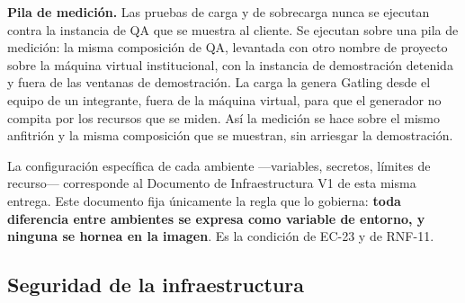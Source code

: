 \documentclass[11pt,a4paper]{article}
\begin{document}
\noindent\textbf{Pila de medición.} Las pruebas de carga y de sobrecarga nunca se ejecutan contra la instancia de QA que se muestra al cliente. Se ejecutan sobre una pila de medición: la misma composición de QA, levantada con otro nombre de proyecto sobre la máquina virtual institucional, con la instancia de demostración detenida y fuera de las ventanas de demostración. La carga la genera Gatling desde el equipo de un integrante, fuera de la máquina virtual, para que el generador no compita por los recursos que se miden. Así la medición se hace sobre el mismo anfitrión y la misma composición que se muestran, sin arriesgar la demostración.

\vspace{0.2cm}
\noindent La configuración específica de cada ambiente ---variables, secretos, límites de recurso--- corresponde al Documento de Infraestructura V1 de esta misma entrega. Este documento fija únicamente la regla que lo gobierna: \textbf{toda diferencia entre ambientes se expresa como variable de entorno, y ninguna se hornea en la imagen}. Es la condición de EC-23 y de RNF-11.

\subsection{Seguridad de la infraestructura}
\end{document}
